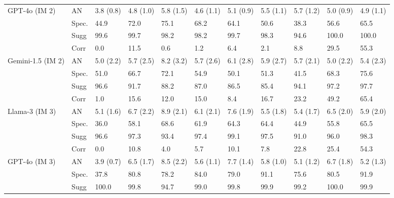 \begin{table}[]
\begin{tabular}{lllllllllll}
    GPT-4o (IM 2) &         AN & 3.8 (0.8) & 4.8 (1.0) &  5.8 (1.5) & 4.6 (1.1) & 5.1 (0.9) & 5.5 (1.1) & 5.7 (1.2) & 5.0 (0.9) & 4.9 (1.1) \\
                  &   Spec. &      44.9 &      72.0 &       75.1 &      68.2 &      64.1 &      50.6 &      38.3 &      56.6 &      65.5 \\
                  & Sugg &      99.6 &      99.7 &       98.2 &      98.2 &      99.7 &      98.3 &      94.6 &     100.0 &     100.0 \\
                  & Corr &       0.0 &      11.5 &        0.6 &       1.2 &       6.4 &       2.1 &       8.8 &      29.5 &      55.3 \\
Gemini-1.5 (IM 2) &         AN & 5.0 (2.2) & 5.7 (2.5) &  8.2 (3.2) & 5.7 (2.6) & 6.1 (2.8) & 5.9 (2.7) & 5.7 (2.1) & 5.0 (2.2) & 5.4 (2.3) \\
                  &   Spec. &      51.0 &      66.7 &       72.1 &      54.9 &      50.1 &      51.3 &      41.5 &      68.3 &      75.6 \\
                  & Sugg &      96.6 &      91.7 &       88.2 &      87.0 &      86.5 &      85.4 &      94.1 &      97.2 &      97.7 \\
                  & Corr &       1.0 &      15.6 &       12.0 &      15.0 &       8.4 &      16.7 &      23.2 &      49.2 &      65.4 \\
   Llama-3 (IM 3) &         AN & 5.1 (1.6) & 6.7 (2.2) &  8.9 (2.1) & 6.1 (2.1) & 7.6 (1.9) & 5.5 (1.8) & 5.4 (1.7) & 6.5 (2.0) & 5.9 (2.0) \\
                  &   Spec. &      36.0 &      58.1 &       68.6 &      61.9 &      64.3 &      64.4 &      44.9 &      55.8 &      65.5 \\
                  & Sugg &      96.6 &      97.3 &       93.4 &      97.4 &      99.1 &      97.5 &      91.0 &      96.0 &      98.3 \\
                  & Corr &       0.0 &      10.8 &        4.0 &       5.7 &      10.1 &       7.8 &      22.8 &      25.4 &      54.3 \\
    GPT-4o (IM 3) &         AN & 3.9 (0.7) & 6.5 (1.7) &  8.5 (2.2) & 5.6 (1.1) & 7.7 (1.4) & 5.8 (1.0) & 5.1 (1.2) & 6.7 (1.8) & 5.2 (1.3) \\
                  &   Spec. &      37.8 &      80.8 &       78.2 &      84.0 &      79.0 &      91.1 &      75.6 &      80.5 &      91.9 \\
                  & Sugg &     100.0 &      99.8 &       94.7 &      99.0 &      99.8 &      99.9 &      99.2 &     100.0 &      99.9 \\

\end{tabular}
\end{table}
